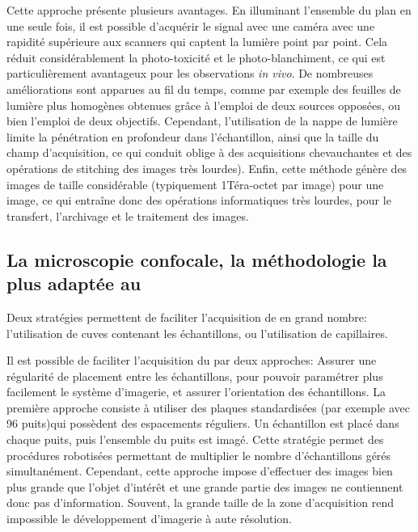 \documentclass[\main/main.tex]{subfiles}
\begin{document}
Cette approche présente plusieurs avantages. En illuminant l'ensemble du plan en une seule fois, il est possible d'acquérir le signal avec une caméra avec une rapidité supérieure aux scanners qui captent la lumière point par point.
Cela réduit considérablement la photo-toxicité et le photo\hyp{}blanchiment, ce qui est particulièrement avantageux pour les observations  \textit{in vivo}.
%
De nombreuses améliorations sont apparues au fil du temps, comme par exemple des feuilles de lumière plus homogènes obtenues grâce à l'emploi de deux sources opposées\cite{huisken_2007}, ou bien l'emploi de deux objectifs.
%
Cependant, l'utilisation de la nappe de lumière limite la pénétration en profondeur dans l'échantillon, ainsi que la taille du champ d'acquisition, ce qui conduit oblige à des acquisitions chevauchantes et des opérations de stitching des images très lourdes). Enfin, cette méthode génère des images de taille considérable (typiquement 1Téra-octet par image) pour une image, ce qui entraîne donc des opérations informatiques très lourdes, pour le transfert, l'archivage et le traitement des images.

    \subsection{La microscopie confocale, la méthodologie la plus adaptée au \hcs{}}
    
Deux stratégies  permettent de faciliter l'acquisition de \pz{} en grand nombre: l'utilisation de cuves contenant les échantillons, ou l'utilisation de capillaires.
   
%
Il est possible de faciliter l'acquisition du \pz{} par deux approches:
Assurer une régularité de placement entre les échantillons,
pour pouvoir paramétrer plus facilement le système d'imagerie, et assurer l'orientation des échantillons.
%
La première approche consiste à utiliser des plaques standardisées (par exemple avec 96 puits)qui possèdent des espacements réguliers. Un échantillon est placé dans chaque puits, puis l'ensemble du puits est imagé. Cette stratégie permet des procédures robotisées permettant de multiplier le nombre d'échantillons gérés simultanément.
%
Cependant, cette approche impose d'effectuer des images bien plus grande que l'objet d'intérêt et une grande partie des images ne contiennent donc pas d'information. Souvent, la grande taille de la zone d'acquisition rend impossible le développement d'imagerie à aute résolution.
\end{document}
